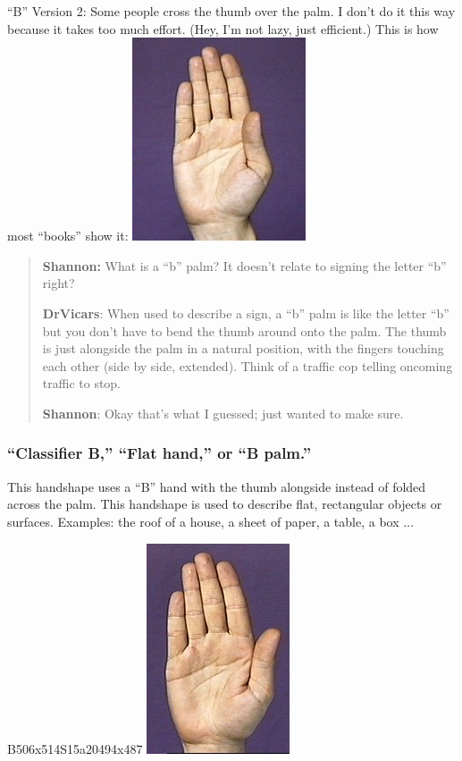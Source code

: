 \documentclass{article}
\begin{document}
``B'' Version 2:
Some people cross the thumb over the palm.
I don't do it this way because it takes too much effort.
(Hey, I'm not lazy, just efficient.)
This is how most ``books'' show it:
\includegraphics[scale=0.5]{images/b1.jpg}

\begin{quote}
\textbf{Shannon:}
What is a ``b'' palm?
It doesn't relate to signing the letter ``b'' right?

\textbf{DrVicars}:
When used to describe a sign, a ``b'' palm is like the letter ``b'' but you don't have to bend the thumb around onto the palm.
The thumb is just alongside the palm in a natural position, with the fingers touching each other (side by side, extended).
Think of a traffic cop telling oncoming traffic to stop.

\textbf{Shannon}:
Okay that's what I guessed; just wanted to make sure.
\end{quote}

\subsubsection{``Classifier B,'' ``Flat hand,'' or ``B palm.''}

This handshape uses a ``B'' hand with the thumb alongside instead of folded across the palm.
This handshape is used to describe flat, rectangular objects or surfaces.
Examples:
the roof of a house, a sheet of paper, a table, a box $\ldots$

B506x514S15a20494x487 \includegraphics[scale=0.5]{images/flat.jpg}
\end{document}
